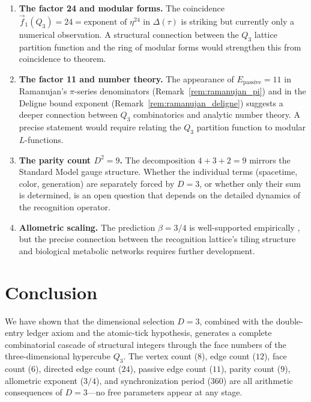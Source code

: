 \documentclass[11pt]{article}
\begin{document}
\begin{enumerate}
  \item \textbf{The factor 24 and modular forms.}
  The coincidence $\vec{f}_1(Q_3) = 24 = \text{exponent of } \eta^{24}$ in $\Delta(\tau)$ is striking but currently only a numerical observation.
  A structural connection between the $Q_3$ lattice partition function and the ring of modular forms would strengthen this from coincidence to theorem.

  \item \textbf{The factor 11 and number theory.}
  The appearance of $E_{\mathrm{passive}} = 11$ in Ramanujan's $\pi$-series denominators (Remark~\ref{rem:ramanujan_pi}) and in the Deligne bound exponent (Remark~\ref{rem:ramanujan_deligne}) suggests a deeper connection between $Q_3$ combinatorics and analytic number theory.
  A precise statement would require relating the $Q_3$ partition function to modular $L$-functions.

  \item \textbf{The parity count $D^2 = 9$.}
  The decomposition $4 + 3 + 2 = 9$ mirrors the Standard Model gauge structure.
  Whether the individual terms (spacetime, color, generation) are separately forced by $D = 3$, or whether only their sum is determined, is an open question that depends on the detailed dynamics of the recognition operator.

  \item \textbf{Allometric scaling.}
  The prediction $\beta = 3/4$ is well-supported empirically \cite{Kleiber1932, West1997}, but the precise connection between the recognition lattice's tiling structure and biological metabolic networks requires further development.
\end{enumerate}

\section{Conclusion}
\label{sec:conclusion}

We have shown that the dimensional selection $D = 3$, combined with the double-entry ledger axiom and the atomic-tick hypothesis, generates a complete combinatorial cascade of structural integers through the face numbers of the three-dimensional hypercube $Q_3$.
The vertex count ($8$), edge count ($12$), face count ($6$), directed edge count ($24$), passive edge count ($11$), parity count ($9$), allometric exponent ($3/4$), and synchronization period ($360$) are all arithmetic consequences of $D = 3$---no free parameters appear at any stage.
\end{document}
